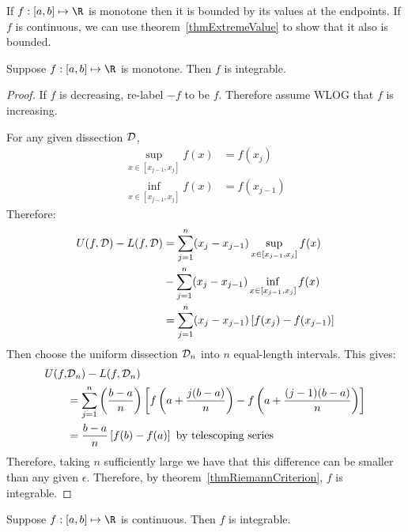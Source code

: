 \documentclass[../Main.tex]{subfiles}
\begin{document}
\begin{remark}
    If $f : [a, b] \mapsto \R$ is monotone then it is bounded by its values at the endpoints. If $f$ is continuous, we can use theorem~\ref{thmExtremeValue} to show that it also is bounded.
\end{remark}
\begin{theorem}
    Suppose $f : [a, b] \mapsto \R$ is monotone. Then $f$ is integrable.
    \label{thmFMonotoneImpliesIntegrable}
\end{theorem}
\begin{proof}
    If $f$ is decreasing, re-label $-f$ to be $f$. Therefore assume WLOG that $f$ is increasing.
    
    For any given dissection $\mathcal{D}$,
    \begin{align*}
        \sup_{x \in [x_{j-1}, x_j]} f(x) &= f(x_j) \\
        \inf_{x \in [x_{j-1}, x_j]} f(x) &= f(x_{j-1}) 
    \end{align*}
    Therefore:
    \begin{align*}
        U(f, \mathcal{D}) - L(f, \mathcal{D}) &= \sum_{j = 1}^n (x_j - x_{j - 1}) \sup_{x \in [x_{j-1}, x_j]} f(x) \\
        &- \sum_{j = 1}^n (x_j - x_{j - 1}) \inf_{x \in [x_{j-1}, x_j]} f(x) \\
        &= \sum_{j = 1}^n (x_j - x_{j - 1}) \left[f(x_j) - f(x_{j - 1})\right]
    \end{align*}
    Then choose the uniform dissection $\mathcal{D}_n$ into $n$ equal-length intervals. This gives:
    \begin{align*}
        U(f, &\mathcal{D}_n) - L(f, \mathcal{D}_n) \\
        &= \sum_{j = 1}^n \left(\frac{b - a}{n}\right) \left[f\left(a + \frac{j(b - a)}{n}\right) - f\left(a + \frac{(j - 1)(b - a)}{n}\right)\right] \\
        &= \frac{b - a}{n} \left[f(b) - f(a)\right] \text{ by telescoping series}
    \end{align*}
    Therefore, taking $n$ sufficiently large we have that this difference can be smaller than any given $\epsilon$. Therefore, by theorem~\ref{thmRiemannCriterion}, $f$ is integrable.
\end{proof}
\begin{theorem}
    Suppose $f : [a, b] \mapsto \R$ is continuous. Then $f$ is integrable.
    \label{thmFCTSImpliesIntegrable}
\end{theorem}
\end{document}
